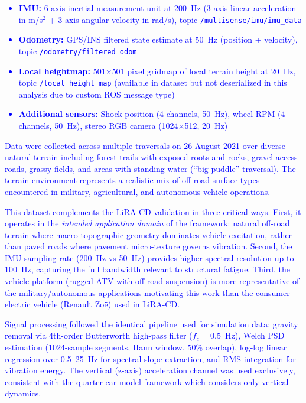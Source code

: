 \documentclass[11pt]{article}
\begin{document}
\textcolor{blue}{\begin{itemize}
\item \textbf{IMU:} 6-axis inertial measurement unit at 200~Hz (3-axis linear acceleration in m/s$^2$ + 3-axis angular velocity in rad/s), topic \texttt{/multisense/imu/imu\_data}
\item \textbf{Odometry:} GPS/INS filtered state estimate at 50~Hz (position + velocity), topic \texttt{/odometry/filtered\_odom}
\item \textbf{Local heightmap:} 501$\times$501 pixel gridmap of local terrain height at 20~Hz, topic \texttt{/local\_height\_map} (available in dataset but not deserialized in this analysis due to custom ROS message type)
\item \textbf{Additional sensors:} Shock position (4 channels, 50~Hz), wheel RPM (4 channels, 50~Hz), stereo RGB camera (1024$\times$512, 20~Hz)
\end{itemize}}

\textcolor{blue}{Data were collected across multiple traversals on 26 August 2021 over diverse natural terrain including forest trails with exposed roots and rocks, gravel access roads, grassy fields, and areas with standing water (``big puddle'' traversal). The terrain environment represents a realistic mix of off-road surface types encountered in military, agricultural, and autonomous vehicle operations.}

\textcolor{blue}{This dataset complements the LiRA-CD validation in three critical ways. First, it operates in the \emph{intended application domain} of the framework: natural off-road terrain where macro-topographic geometry dominates vehicle excitation, rather than paved roads where pavement micro-texture governs vibration. Second, the IMU sampling rate (200~Hz vs 50~Hz) provides higher spectral resolution up to 100~Hz, capturing the full bandwidth relevant to structural fatigue. Third, the vehicle platform (rugged ATV with off-road suspension) is more representative of the military/autonomous applications motivating this work than the consumer electric vehicle (Renault Zo\"{e}) used in LiRA-CD.}

\textcolor{blue}{Signal processing followed the identical pipeline used for simulation data: gravity removal via 4th-order Butterworth high-pass filter ($f_c = 0.5$~Hz), Welch PSD estimation (1024-sample segments, Hann window, 50\% overlap), log-log linear regression over 0.5--25~Hz for spectral slope extraction, and RMS integration for vibration energy. The vertical (z-axis) acceleration channel was used exclusively, consistent with the quarter-car model framework which considers only vertical dynamics.}
\end{document}
